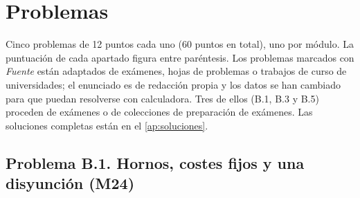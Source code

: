 \chapter{Problemas}
\label{cap:problemas}

Cinco problemas de 12 puntos cada uno (60 puntos en total), uno por módulo. La puntuación de cada apartado figura entre paréntesis. Los problemas marcados con \emph{Fuente} están adaptados de exámenes, hojas de problemas o trabajos de curso de universidades; el enunciado es de redacción propia y los datos se han cambiado para que puedan resolverse con calculadora. Tres de ellos (B.1, B.3 y B.5) proceden de exámenes o de colecciones de preparación de exámenes. Las soluciones completas están en el \cref{ap:soluciones}.

\section*{Problema B.1. Hornos, costes fijos y una disyunción (M24)}


